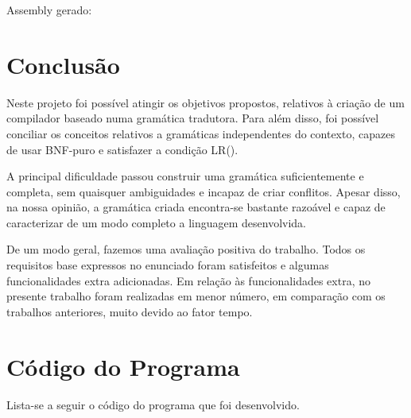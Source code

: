 \documentclass{report}
\begin{document}
Assembly gerado:


\chapter{Conclusão} \label{concl}

 
Neste projeto foi possível atingir os objetivos propostos, relativos à criação de um compilador baseado numa gramática tradutora. Para além disso, foi possível conciliar os conceitos relativos a gramáticas independentes do contexto, capazes de usar BNF-puro e satisfazer a condição LR(). 

A principal dificuldade passou construir uma gramática suficientemente e completa, sem quaisquer ambiguidades e incapaz de criar conflitos. Apesar disso, na nossa opinião, a gramática criada encontra-se bastante razoável e capaz de caracterizar de um modo completo a linguagem desenvolvida.

De um modo geral, fazemos uma avaliação positiva do trabalho. Todos os requisitos base expressos no enunciado foram satisfeitos e algumas funcionalidades extra adicionadas. Em relação às funcionalidades extra, no presente trabalho foram realizadas em menor número, em comparação com os trabalhos anteriores, muito devido ao fator tempo. 

\appendix
\chapter{Código do Programa}

Lista-se a seguir o código  do programa  que foi desenvolvido.






\end{document}
